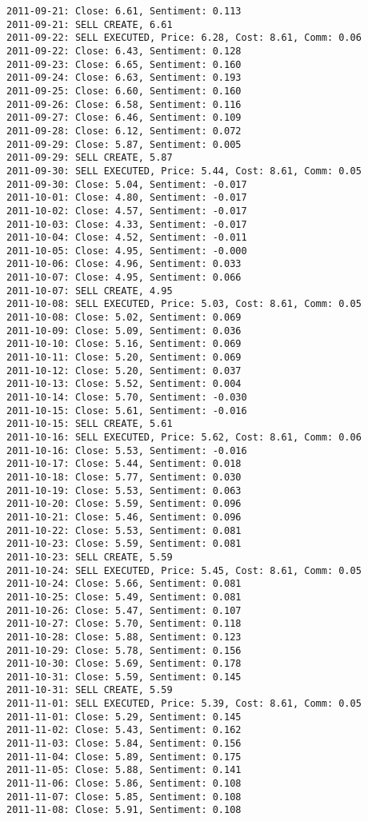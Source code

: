 \documentclass[11pt]{article}
\begin{document}
\begin{Verbatim}[commandchars=\\\{\}]
2011-09-21: Close: 6.61, Sentiment: 0.113
2011-09-21: SELL CREATE, 6.61
2011-09-22: SELL EXECUTED, Price: 6.28, Cost: 8.61, Comm: 0.06
2011-09-22: Close: 6.43, Sentiment: 0.128
2011-09-23: Close: 6.65, Sentiment: 0.160
2011-09-24: Close: 6.63, Sentiment: 0.193
2011-09-25: Close: 6.60, Sentiment: 0.160
2011-09-26: Close: 6.58, Sentiment: 0.116
2011-09-27: Close: 6.46, Sentiment: 0.109
2011-09-28: Close: 6.12, Sentiment: 0.072
2011-09-29: Close: 5.87, Sentiment: 0.005
2011-09-29: SELL CREATE, 5.87
2011-09-30: SELL EXECUTED, Price: 5.44, Cost: 8.61, Comm: 0.05
2011-09-30: Close: 5.04, Sentiment: -0.017
2011-10-01: Close: 4.80, Sentiment: -0.017
2011-10-02: Close: 4.57, Sentiment: -0.017
2011-10-03: Close: 4.33, Sentiment: -0.017
2011-10-04: Close: 4.52, Sentiment: -0.011
2011-10-05: Close: 4.95, Sentiment: -0.000
2011-10-06: Close: 4.96, Sentiment: 0.033
2011-10-07: Close: 4.95, Sentiment: 0.066
2011-10-07: SELL CREATE, 4.95
2011-10-08: SELL EXECUTED, Price: 5.03, Cost: 8.61, Comm: 0.05
2011-10-08: Close: 5.02, Sentiment: 0.069
2011-10-09: Close: 5.09, Sentiment: 0.036
2011-10-10: Close: 5.16, Sentiment: 0.069
2011-10-11: Close: 5.20, Sentiment: 0.069
2011-10-12: Close: 5.20, Sentiment: 0.037
2011-10-13: Close: 5.52, Sentiment: 0.004
2011-10-14: Close: 5.70, Sentiment: -0.030
2011-10-15: Close: 5.61, Sentiment: -0.016
2011-10-15: SELL CREATE, 5.61
2011-10-16: SELL EXECUTED, Price: 5.62, Cost: 8.61, Comm: 0.06
2011-10-16: Close: 5.53, Sentiment: -0.016
2011-10-17: Close: 5.44, Sentiment: 0.018
2011-10-18: Close: 5.77, Sentiment: 0.030
2011-10-19: Close: 5.53, Sentiment: 0.063
2011-10-20: Close: 5.59, Sentiment: 0.096
2011-10-21: Close: 5.46, Sentiment: 0.096
2011-10-22: Close: 5.53, Sentiment: 0.081
2011-10-23: Close: 5.59, Sentiment: 0.081
2011-10-23: SELL CREATE, 5.59
2011-10-24: SELL EXECUTED, Price: 5.45, Cost: 8.61, Comm: 0.05
2011-10-24: Close: 5.66, Sentiment: 0.081
2011-10-25: Close: 5.49, Sentiment: 0.081
2011-10-26: Close: 5.47, Sentiment: 0.107
2011-10-27: Close: 5.70, Sentiment: 0.118
2011-10-28: Close: 5.88, Sentiment: 0.123
2011-10-29: Close: 5.78, Sentiment: 0.156
2011-10-30: Close: 5.69, Sentiment: 0.178
2011-10-31: Close: 5.59, Sentiment: 0.145
2011-10-31: SELL CREATE, 5.59
2011-11-01: SELL EXECUTED, Price: 5.39, Cost: 8.61, Comm: 0.05
2011-11-01: Close: 5.29, Sentiment: 0.145
2011-11-02: Close: 5.43, Sentiment: 0.162
2011-11-03: Close: 5.84, Sentiment: 0.156
2011-11-04: Close: 5.89, Sentiment: 0.175
2011-11-05: Close: 5.88, Sentiment: 0.141
2011-11-06: Close: 5.86, Sentiment: 0.108
2011-11-07: Close: 5.85, Sentiment: 0.108
2011-11-08: Close: 5.91, Sentiment: 0.108

\end{Verbatim}
\end{document}
